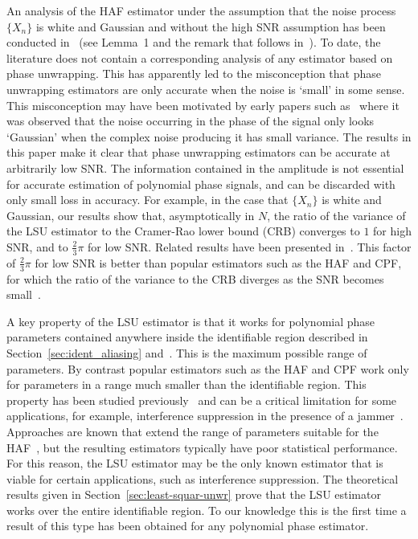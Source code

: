 \documentclass[journal]{IEEEtran}
\begin{document}
An analysis of the HAF estimator under the assumption that the noise process $\{X_n\}$ is white and Gaussian and without the high SNR assumption has been conducted in~\cite{Porat_asympt_HAF_DPT_1996} (see Lemma~1 and the remark that follows in~\cite{Porat_asympt_HAF_DPT_1996}).  To date, the literature does not contain a corresponding analysis of any estimator based on phase unwrapping.  This has apparently led to the misconception that phase unwrapping estimators are only accurate when the noise is `small' in some sense.  This misconception may have been motivated by early papers such as~\cite{Tretter1985,Kay1989} where it was observed that the noise occurring in the phase of the signal only looks `Gaussian' when the complex noise producing it has small variance.  The results in this paper make it clear that phase unwrapping estimators can be accurate at arbitrarily low SNR.  The information contained in the amplitude is not essential for accurate estimation of polynomial phase signals, and can be discarded with only small loss in accuracy.  For example, in the case that $\{X_n\}$ is white and Gaussian, our results show that, asymptotically in $N$, the ratio of the variance of the LSU estimator to the Cramer-Rao lower bound (CRB) converges to $1$ for high SNR, and to $\tfrac{2}{3}\pi$ for low SNR.  Related results have been presented in~\cite{Quinn2009_dasp_phase_only_information_loss}.  This factor of $\tfrac{2}{3}\pi$ for low SNR is better than popular estimators such as the HAF and CPF, for which the ratio of the variance to the CRB diverges as the SNR becomes small~\cite{Porat_asympt_HAF_DPT_1996,Oshea_cpf_2004,Djurovic_haf_cpf_2012}.

A key property of the LSU estimator is that it works for polynomial phase parameters contained anywhere inside the identifiable region described in Section~\ref{sec:ident_aliasing} and~\cite{Xia_dynamic_range_pps_2001,McKilliam2009IndentifiabliltyAliasingPolyphase}.  This is the maximum possible range of parameters.  By contrast popular estimators such as the HAF and CPF work only for parameters in a range much smaller than the identifiable region.  This property has been studied previously~\cite{Djurovic_aliasing_2012,McKilliam2009IndentifiabliltyAliasingPolyphase,Zhou_lag_diverity_PPT_1997,Xia_dynamic_range_pps_2001} and can be a critical limitation for some applications, for example, interference suppression in the presence of a jammer~\cite{Djukanovic:2011:PMN:1950994.1951252,Djurovic_aliasing_2012}.  Approaches are known that extend the range of parameters suitable for the HAF~\cite{Zhou_lag_diverity_PPT_1997,Djurovic_aliasing_2012}, but the resulting estimators typically have poor statistical performance.  For this reason, the LSU estimator may be the only known estimator that is viable for certain applications, such as interference suppression.  The theoretical results given in Section~\ref{sec:least-squar-unwr} prove that the LSU estimator works over the entire identifiable region.  To our knowledge this is the first time a result of this type has been obtained for any polynomial phase estimator.
\end{document}
